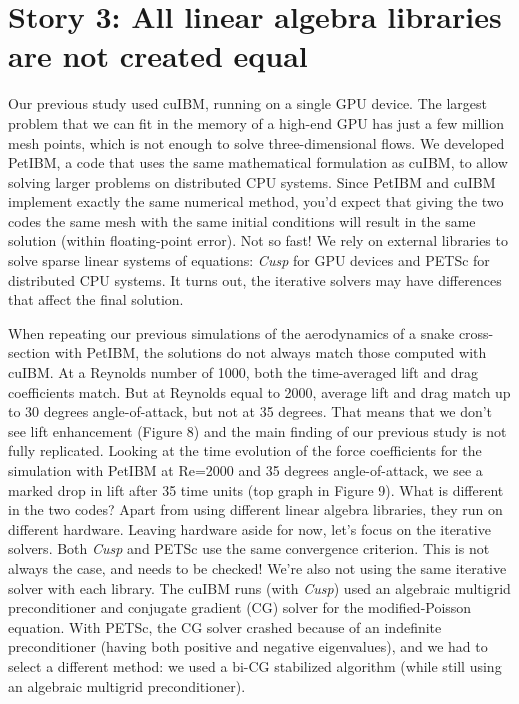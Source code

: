 \documentclass[9pt,twocolumn,twoside]{article}
\newlength{\up}
\begin{document}
\section*{Story 3: All linear algebra libraries are not created equal}

Our previous study used cuIBM, running on a single GPU device. 
The largest problem that we can fit in the memory of a high-end GPU has just a few million mesh points, which is not enough to solve three-dimensional flows. 
We developed PetIBM, a code that uses the same mathematical formulation as cuIBM, to allow solving larger problems on distributed CPU systems. 
Since PetIBM and cuIBM implement exactly the same numerical method, you'd expect that giving the two codes the same mesh with the same initial conditions will result in the same solution (within floating-point error). 
Not so fast! 
We rely on external libraries to solve sparse linear systems of equations: \textsl{Cusp} for GPU devices and PETSc for distributed CPU systems. 
It turns out, the iterative solvers may have differences that affect the final solution.

When repeating our previous simulations of the aerodynamics of a snake cross-section with PetIBM, the solutions do not always match those computed with cuIBM. 
At a Reynolds number of 1000, both the time-averaged lift and drag coefficients match. 
But at Reynolds equal to 2000, average lift and drag match up to 30 degrees angle-of-attack, but not at 35 degrees. 
That means that we don't see lift enhancement (Figure 8) and the main finding of our previous study is not fully replicated. 
Looking at the time evolution of the force coefficients for the simulation with PetIBM at Re=2000 and 35 degrees angle-of-attack, we see a marked drop in lift after 35 time units (top graph in Figure 9). 
What is different in the two codes? 
Apart from using different linear algebra libraries, they run on different hardware. 
Leaving hardware aside for now, let's focus on the iterative solvers. 
Both \textsl{Cusp} and PETSc use the same convergence criterion. 
This is not always the case, and needs to be checked! 
We're also not using the same iterative solver with each library. 
The cuIBM runs (with \textsl{Cusp}) used an algebraic multigrid preconditioner and conjugate gradient (CG) solver for the modified-Poisson equation. 
With PETSc, the CG solver crashed because of an indefinite preconditioner (having both positive and negative eigenvalues), and we had to select a different method: we used a bi-CG stabilized algorithm (while still using an algebraic multigrid preconditioner). 
\end{document}
